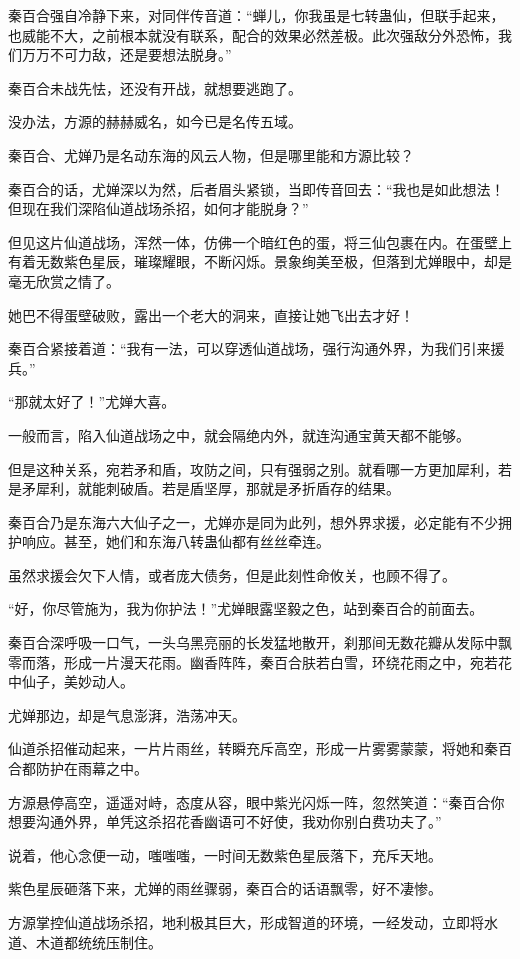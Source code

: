 \begin{this_body}
秦百合强自冷静下来，对同伴传音道：“蝉儿，你我虽是七转蛊仙，但联手起来，也威能不大，之前根本就没有联系，配合的效果必然差极。此次强敌分外恐怖，我们万万不可力敌，还是要想法脱身。”

秦百合未战先怯，还没有开战，就想要逃跑了。

没办法，方源的赫赫威名，如今已是名传五域。

秦百合、尤婵乃是名动东海的风云人物，但是哪里能和方源比较？

秦百合的话，尤婵深以为然，后者眉头紧锁，当即传音回去：“我也是如此想法！但现在我们深陷仙道战场杀招，如何才能脱身？”

但见这片仙道战场，浑然一体，仿佛一个暗红色的蛋，将三仙包裹在内。在蛋壁上有着无数紫色星辰，璀璨耀眼，不断闪烁。景象绚美至极，但落到尤婵眼中，却是毫无欣赏之情了。

她巴不得蛋壁破败，露出一个老大的洞来，直接让她飞出去才好！

秦百合紧接着道：“我有一法，可以穿透仙道战场，强行沟通外界，为我们引来援兵。”

“那就太好了！”尤婵大喜。

一般而言，陷入仙道战场之中，就会隔绝内外，就连沟通宝黄天都不能够。

但是这种关系，宛若矛和盾，攻防之间，只有强弱之别。就看哪一方更加犀利，若是矛犀利，就能刺破盾。若是盾坚厚，那就是矛折盾存的结果。

秦百合乃是东海六大仙子之一，尤婵亦是同为此列，想外界求援，必定能有不少拥护响应。甚至，她们和东海八转蛊仙都有丝丝牵连。

虽然求援会欠下人情，或者庞大债务，但是此刻性命攸关，也顾不得了。

“好，你尽管施为，我为你护法！”尤婵眼露坚毅之色，站到秦百合的前面去。

秦百合深呼吸一口气，一头乌黑亮丽的长发猛地散开，刹那间无数花瓣从发际中飘零而落，形成一片漫天花雨。幽香阵阵，秦百合肤若白雪，环绕花雨之中，宛若花中仙子，美妙动人。

尤婵那边，却是气息澎湃，浩荡冲天。

仙道杀招催动起来，一片片雨丝，转瞬充斥高空，形成一片雾雾蒙蒙，将她和秦百合都防护在雨幕之中。

方源悬停高空，遥遥对峙，态度从容，眼中紫光闪烁一阵，忽然笑道：“秦百合你想要沟通外界，单凭这杀招花香幽语可不好使，我劝你别白费功夫了。”

说着，他心念便一动，嗤嗤嗤，一时间无数紫色星辰落下，充斥天地。

紫色星辰砸落下来，尤婵的雨丝骤弱，秦百合的话语飘零，好不凄惨。

方源掌控仙道战场杀招，地利极其巨大，形成智道的环境，一经发动，立即将水道、木道都统统压制住。


\end{this_body}

